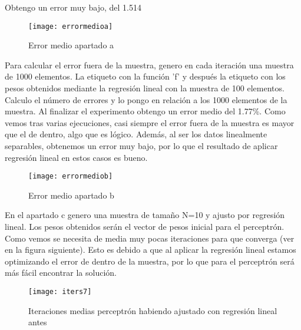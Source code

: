 	Obtengo un error muy bajo, del 1.514%
	\begin{figure} [H]
	\centering
	\texttt{[image: errormedioa]}
	\caption{Error medio apartado a}
	\label{fig:errormedioa}
	\end{figure}
	
	Para calcular el error fuera de la muestra, genero en cada iteración una muestra de 1000 elementos. La etiqueto con la función 'f' y después la etiqueto con los pesos obtenidos mediante la regresión lineal con la muestra de 100 elementos. Calculo el número de errores y lo pongo en relación a los 1000 elementos de la muestra. Al finalizar el experimento obtengo un error medio del 1.77\%. Como vemos tras varias ejecuciones, casi siempre el error fuera de la muestra es mayor que el de dentro, algo que es lógico. Además, al ser los datos linealmente separables, obtenemos un error muy bajo, por lo que el resultado de aplicar regresión lineal en estos casos es bueno.
	
	\begin{figure} [H]
	\centering
	\texttt{[image: errormediob]}
	\caption{Error medio apartado b}
	\label{fig:errormediob}
	\end{figure}
	
	En el apartado c genero una muestra de tamaño N=10 y ajusto por regresión lineal. Los pesos obtenidos serán el vector de pesos inicial para el perceptrón. Como vemos se necesita de media muy pocas iteraciones para que converga (ver en la figura siguiente). Esto es debido a que al aplicar la regresión lineal estamos optimizando el error de dentro de la muestra, por lo que para el perceptrón será más fácil encontrar la solución.
	\begin{figure} [H]
	\centering
	\texttt{[image: iters7]}
	\caption{Iteraciones medias perceptrón habiendo ajustado con regresión lineal antes}
	\label{fig:iters7}
	\end{figure}

